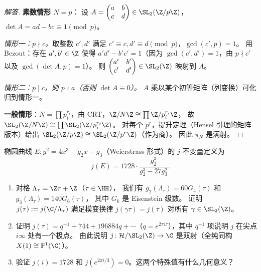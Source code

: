 \begin{proof}[解答]
\textbf{素数情形 $N = p$}：
设 $A = \begin{pmatrix}a&b\\c&d\end{pmatrix} \in \SL_2(\Z/p\Z)$，$\det A = ad-bc \equiv 1 \pmod{p}$。

\textit{情形一：$p \nmid c$。}取整数 $c', d'$ 满足 $c' \equiv c, d' \equiv d \pmod{p}$，$\gcd(c',p) = 1$。
用 Bezout：存在 $a', b' \in \Z$ 使得 $a'd' - b'c' = 1$（因为 $\gcd(c',d') = 1$，由 $p \nmid c'$ 以及 $\gcd(\det A, p) = 1$）。
则 $\begin{pmatrix}a'&b'\\c'&d'\end{pmatrix} \in \SL_2(\Z)$ 映射到 $A$。

\textit{情形二：$p \mid c$，则 $p \nmid a$（否则 $\det A \equiv 0$）。}
$A$ 乘以某个初等矩阵（列变换）可化归到情形一。

\textbf{一般情形}：$N = \prod p_i^{r_i}$，由 CRT，$\Z/N\Z \cong \prod \Z/p_i^{r_i}\Z$，
故 $\SL_2(\Z/N\Z) \cong \prod \SL_2(\Z/p_i^{r_i}\Z)$。
对每个 $p^r$，提升定理（Hensel 引理的矩阵版本）给出 $\SL_2(\Z/p\Z) \cong \SL_2(\Z/p^r\Z)$（作为商）。
因此 $\pi_N$ 是满射。\qedhere
\end{proof}

\begin{exercise}
\label{ex:ch1-j-invariant}
椭圆曲线 $E \colon y^2 = 4x^3 - g_2 x - g_3$（Weierstrass 形式）的 $j$-不变量定义为
\[
  j(E) = 1728 \cdot \frac{g_2^3}{g_2^3 - 27g_3^2}.
\]
\begin{enumerate}
  \item[(1)] 对格 $\Lambda_\tau = \Z\tau + \Z$（$\tau \in \HH$），
    我们有 $g_2(\Lambda_\tau) = 60 G_4(\tau)$ 和 $g_3(\Lambda_\tau) = 140 G_6(\tau)$，
    其中 $G_k$ 是 Eisenstein 级数。
    证明 $j(\tau) := j(\C/\Lambda_\tau)$ 满足模变换律 $j(\gamma\tau) = j(\tau)$ 对所有 $\gamma \in \SL_2(\Z)$。
  \item[(2)] 证明 $j(\tau) = q^{-1} + 744 + 196884q + \cdots$（$q = e^{2\pi i\tau}$），其中 $q^{-1}$ 项说明 $j$ 在尖点 $i\infty$ 处有一个极点。
    由此说明 $j \colon \mathcal{H}/\SL_2(\Z) \to \C$ 是双射（全纯同构 $X(1) \cong \mathbb{P}^1(\C)$）。
  \item[(3)] 验证 $j(i) = 1728$ 和 $j(e^{2\pi i/3}) = 0$。这两个特殊值有什么几何意义？
\end{enumerate}
\end{exercise}

